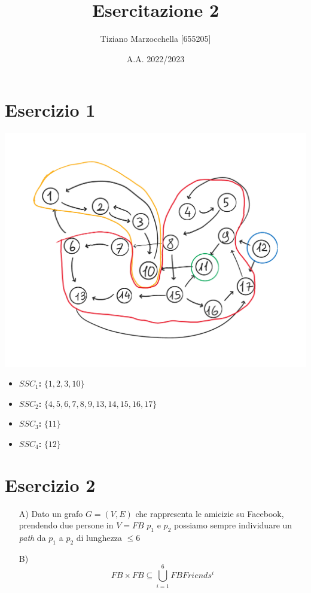 \documentclass{article}
\title{Esercitazione 2}
\author{Tiziano Marzocchella [655205]}
\date{A.A. 2022/2023}
\begin{document}
\maketitle

\section{Esercizio 1}
\includegraphics[width=\textwidth]{es1.png}
\begin{itemize}
    \item \textbf{\(SSC_1\):} \(\{1,2,3,10\}\)
    \item \textbf{\(SSC_2\):} \(\{4,5,6,7,8,9,13,14,15,16,17\}\)
    \item \textbf{\(SSC_3\):} \(\{11\}\)
    \item \textbf{\(SSC_4\):} \(\{12\}\)
\end{itemize}

\section{Esercizio 2}
\begin{enumerate}
    \item[A)] Dato un grafo \(G = (V, E)\) che rappresenta le amicizie su Facebook, prendendo due persone in \(V = FB\) \(p_1\) e \(p_2\) possiamo sempre individuare un \emph{path} da \(p_1\) a \(p_2\) di lunghezza \(\leq 6\)
    \item[B)] \[FB \times FB \subseteq \bigcup_{i = 1}^6 FBFriends^i\]
\end{enumerate}
\end{document}
